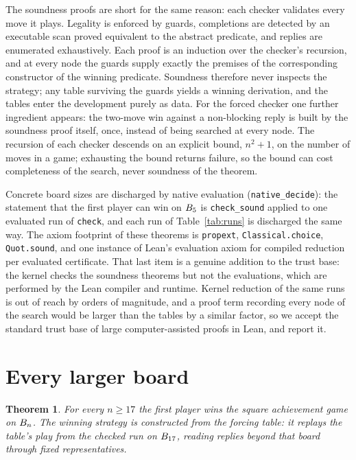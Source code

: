 \documentclass[11pt]{amsart}
\newtheorem{theorem}{Theorem}[section]
\theoremstyle{definition}
\theoremstyle{remark}
\begin{document}
The soundness proofs are short for the same reason: each checker
validates every move it plays. Legality is enforced by guards, completions are
detected by an executable scan proved equivalent to the abstract
predicate, and replies are enumerated exhaustively. Each proof is an
induction over the checker's recursion, and at every node the guards
supply exactly the premises of the corresponding constructor of the
winning predicate. Soundness
therefore never inspects the strategy; any table surviving the
guards yields a winning derivation, and the tables enter the
development purely as data. For the forced checker one further
ingredient appears: the two-move win against a non-blocking reply is
built by the soundness proof itself, once, instead of being searched
at every node. The recursion of each checker descends on an explicit
bound, $n^2 + 1$, on the number of moves in a game; exhausting the
bound returns failure, so the bound can cost completeness of the
search, never soundness of the theorem.

Concrete board sizes are discharged by native evaluation
(\texttt{native\_decide}): the statement that the first player can
win on $B_5$ is \texttt{check\_sound} applied to one evaluated
run of \texttt{check}, and each run of Table~\ref{tab:runs} is
discharged the same way. The axiom footprint of these theorems
is \texttt{propext}, \texttt{Classical.choice}, \texttt{Quot.sound},
and one instance of Lean's evaluation axiom for compiled reduction
per evaluated certificate. That last item is a genuine addition to
the trust base: the kernel checks the soundness theorems but not the
evaluations, which are performed by the Lean compiler and runtime.
Kernel reduction of the same runs is out of reach by orders of
magnitude, and a proof term recording every node of the search would
be larger than the tables by a similar factor, so we accept the
standard trust base of large computer-assisted proofs in Lean, and
report it.

\section{Every larger board}\label{sec:uniform}

\begin{theorem}\label{thm:uniform}
For every $n \ge 17$ the first player wins the square achievement
game on $B_n$. The winning strategy is constructed from the
forcing table: it replays the table's play from the checked run on
$B_{17}$, reading replies beyond that board through fixed
representatives.
\end{theorem}
\end{document}
